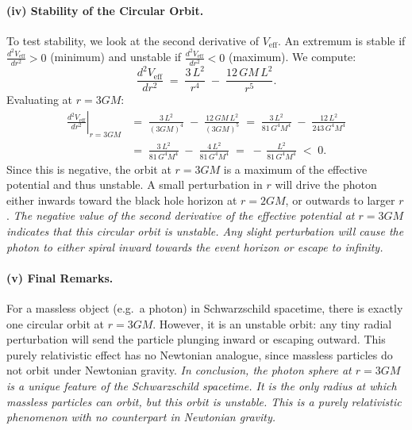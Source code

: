 \paragraph{(iv) Stability of the Circular Orbit.}
To test stability, we look at the second derivative of \(V_\mathrm{eff}\). An extremum is stable if \(\tfrac{d^2V_\mathrm{eff}}{dr^2} > 0\) (minimum) and unstable if \(\tfrac{d^2V_\mathrm{eff}}{dr^2} < 0\) (maximum). We compute:
\begin{equation}
\frac{d^2V_\mathrm{eff}}{dr^2}
\;=\;
\frac{3\,L^2}{r^4}
\;-\;
\frac{12\,GM\,L^2}{r^5}.
\end{equation}
Evaluating at \(r = 3GM\):
\begin{align}
\left.\frac{d^2V_\mathrm{eff}}{dr^2}\right|_{r=3GM}
&=\;
\frac{3\,L^2}{(3GM)^4}
\;-\;
\frac{12\,GM\,L^2}{(3GM)^5}
\;=\;
\frac{3\,L^2}{81\,G^4M^4}
\;-\;
\frac{12\,L^2}{243\,G^4M^4}
\nonumber\\
&=\;
\frac{3\,L^2}{81\,G^4M^4}
\;-\;
\frac{4\,L^2}{81\,G^4M^4}
\;=\;
-\,\frac{L^2}{81\,G^4M^4}
\;<\;0.
\end{align}
Since this is negative, the orbit at \(r=3GM\) is a maximum of the effective potential and thus unstable. A small perturbation in \(r\) will drive the photon either inwards toward the black hole horizon at \(r=2GM\), or outwards to larger \(r\).
\textit{The negative value of the second derivative of the effective potential at $r=3GM$ indicates that this circular orbit is unstable. Any slight perturbation will cause the photon to either spiral inward towards the event horizon or escape to infinity.}

\paragraph{(v) Final Remarks.}
For a massless object (e.g.\ a photon) in Schwarzschild spacetime, there is exactly one circular orbit at \(r=3GM\). However, it is an unstable orbit: any tiny radial perturbation will send the particle plunging inward or escaping outward. This purely relativistic effect has no Newtonian analogue, since massless particles do not orbit under Newtonian gravity.
\textit{In conclusion, the photon sphere at $r=3GM$ is a unique feature of the Schwarzschild spacetime. It is the only radius at which massless particles can orbit, but this orbit is unstable. This is a purely relativistic phenomenon with no counterpart in Newtonian gravity.}

\pagebreak


